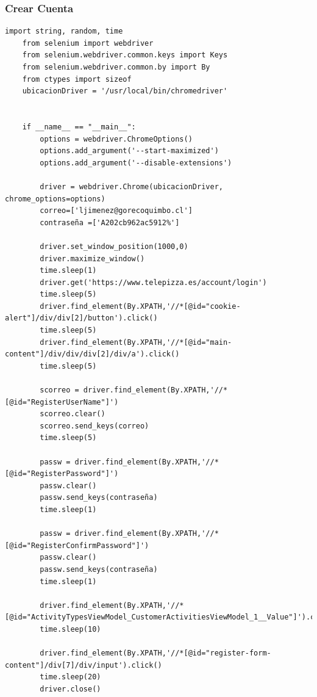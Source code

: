 \documentclass{article}
\begin{document}
\subsubsection{Crear Cuenta}

\begin{lstlisting}[lenguaje=py]
    import string, random, time
    from selenium import webdriver
    from selenium.webdriver.common.keys import Keys
    from selenium.webdriver.common.by import By
    from ctypes import sizeof
    ubicacionDriver = '/usr/local/bin/chromedriver'
    
    
    if __name__ == "__main__":
        options = webdriver.ChromeOptions()
        options.add_argument('--start-maximized')
        options.add_argument('--disable-extensions')
    
        driver = webdriver.Chrome(ubicacionDriver, chrome_options=options)
        correo=['ljimenez@gorecoquimbo.cl']
        contraseña =['A202cb962ac5912%']
    
        driver.set_window_position(1000,0)
        driver.maximize_window()
        time.sleep(1)
        driver.get('https://www.telepizza.es/account/login')
        time.sleep(5)
        driver.find_element(By.XPATH,'//*[@id="cookie-alert"]/div/div[2]/button').click()
        time.sleep(5)
        driver.find_element(By.XPATH,'//*[@id="main-content"]/div/div/div[2]/div/a').click()
        time.sleep(5)
    
        scorreo = driver.find_element(By.XPATH,'//*[@id="RegisterUserName"]')
        scorreo.clear()
        scorreo.send_keys(correo)
        time.sleep(5)
    
        passw = driver.find_element(By.XPATH,'//*[@id="RegisterPassword"]')
        passw.clear()
        passw.send_keys(contraseña)
        time.sleep(1)
        
        passw = driver.find_element(By.XPATH,'//*[@id="RegisterConfirmPassword"]')
        passw.clear()
        passw.send_keys(contraseña)
        time.sleep(1)
        
        driver.find_element(By.XPATH,'//*[@id="ActivityTypesViewModel_CustomerActivitiesViewModel_1__Value"]').click()
        time.sleep(10)
        
        driver.find_element(By.XPATH,'//*[@id="register-form-content"]/div[7]/div/input').click()
        time.sleep(20)
        driver.close()
\end{lstlisting}
\end{document}
